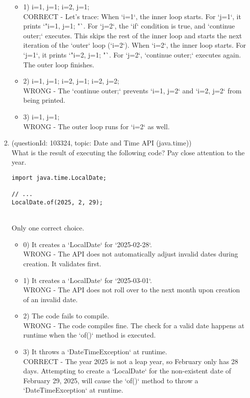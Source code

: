 \documentclass[12pt]{article}
\begin{document}
\begin{enumerate}[label=(\arabic*)]
\begin{itemize}
\item 1) i=1, j=1; i=2, j=1; 
 \\ 
CORRECT - Let's trace: When `i=1`, the inner loop starts. For `j=1`, it prints `"i=1, j=1; "`. For `j=2`, the `if` condition is true, and `continue outer;` executes. This skips the rest of the inner loop and starts the next iteration of the `outer` loop (`i=2`). When `i=2`, the inner loop starts. For `j=1`, it prints `"i=2, j=1; "`. For `j=2`, `continue outer;` executes again. The outer loop finishes.

\item 2) i=1, j=1; i=2, j=1; i=2, j=2; 
 \\ 
WRONG - The `continue outer;` prevents `i=1, j=2` and `i=2, j=2` from being printed.

\item 3) i=1, j=1; 
 \\ 
WRONG - The outer loop runs for `i=2` as well.

\end{itemize}
\item (questionId: 103324, topic: Date and Time API (java.time)) \\ 
What is the result of executing the following code? Pay close attention to the year.
\begin{verbatim}
import java.time.LocalDate;

// ...
LocalDate.of(2025, 2, 29);
\end{verbatim}
\\ \noindent Only one correct choice. 
\begin{itemize}
\item 0) It creates a `LocalDate` for `2025-02-28`.
 \\ 
WRONG - The API does not automatically adjust invalid dates during creation. It validates first.

\item 1) It creates a `LocalDate` for `2025-03-01`.
 \\ 
WRONG - The API does not roll over to the next month upon creation of an invalid date.

\item 2) The code fails to compile.
 \\ 
WRONG - The code compiles fine. The check for a valid date happens at runtime when the `of()` method is executed.

\item 3) It throws a `DateTimeException` at runtime.
 \\ 
CORRECT - The year 2025 is not a leap year, so February only has 28 days. Attempting to create a `LocalDate` for the non-existent date of February 29, 2025, will cause the `of()` method to throw a `DateTimeException` at runtime.


\end{itemize}
\end{enumerate}
\end{document}
